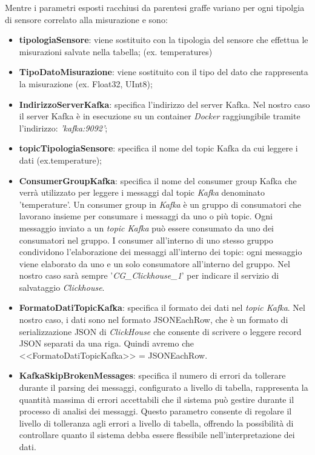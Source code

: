     Mentre i parametri esposti racchiusi da parentesi graffe variano per ogni tipolgia di sensore correlato alla misurazione e sono:
    \begin{itemize}
        \item \textbf{tipologiaSensore}: viene sostituito con la tipologia del sensore che effettua le misurazioni salvate nella tabella; (ex. temperatures)
        \item \textbf{TipoDatoMisurazione}: viene sostituito con il tipo del dato che rappresenta la misurazione (ex. Float32, UInt8);
        \item \textbf{IndirizzoServerKafka}: specifica l'indirizzo del server Kafka.
        Nel nostro caso il server Kafka è in esecuzione su un container \textit{Docker} raggiungibile tramite l'indirizzo:
         \textit{'kafka:9092'};
        \item \textbf{topicTipologiaSensore}: specifica il nome del topic Kafka da cui leggere i dati (ex.temperature);
        \item \textbf{ConsumerGroupKafka}: specifica il nome del consumer group Kafka che verrà utilizzato per leggere i messaggi dal topic \textit{Kafka} denominato 'temperature'.
        Un consumer group in \textit{Kafka} è un gruppo di consumatori che lavorano insieme per consumare i messaggi da uno o più topic. Ogni messaggio inviato a un \textit{topic Kafka} può essere consumato da uno dei consumatori nel gruppo. I consumer all'interno di uno stesso gruppo condividono l'elaborazione dei messaggi all'interno dei topic: ogni messaggio viene elaborato da uno e un solo consumatore all'interno del gruppo. Nel nostro caso sarà sempre '\textit{CG\_Clickhouse\_1}' per indicare il servizio di salvataggio \textit{Clickhouse}.
        \item \textbf{FormatoDatiTopicKafka}: specifica il formato dei dati nel \textit{topic Kafka}. Nel nostro caso, i dati sono nel formato JSONEachRow, che è un formato di serializzazione JSON di \textit{ClickHouse} che consente di scrivere o leggere record JSON separati da una riga. Quindi avremo che <<FormatoDatiTopicKafka>> = JSONEachRow.
        \item \textbf{KafkaSkipBrokenMessages}: specifica il numero di errori da tollerare durante il parsing dei messaggi, configurato a livello di tabella, rappresenta la quantità massima di errori accettabili che il sistema può gestire durante il processo di analisi dei messaggi. Questo parametro consente di regolare il livello di tolleranza agli errori a livello di tabella, offrendo la possibilità di controllare quanto il sistema debba essere flessibile nell'interpretazione dei dati.
    \end{itemize}

